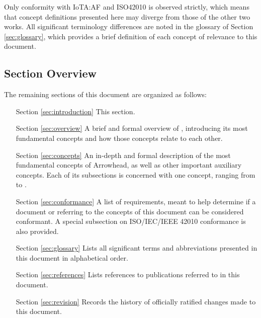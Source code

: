\begin{enumerate}
\end{enumerate}

Only conformity with IoTA:AF and ISO42010 is observed strictly, which means that concept definitions presented here may diverge from those of the other two works.
All significant terminology differences are noted in the glossary of Section \ref{sec:glossary}, which provides a brief definition of each concept of relevance to this document.

\subsection{Section Overview}
\label{sec:introduction:sections}

The remaining sections of this document are organized as follows:
\vspace*{2mm}
\begin{itemize}[leftmargin=2cm,rightmargin=0pt,labelwidth=2cm,labelsep=0pt,itemindent=0pt,parsep=0.1cm,topsep=0.1cm,align=left]

\item[Section \ref{sec:introduction}]
This section.

\item[Section \ref{sec:overview}]
A brief and formal overview of , introducing its most fundamental concepts and how those concepts relate to each other.

\item[Section \ref{sec:concepts}]
An in-depth and formal description of the most fundamental concepts of Arrowhead, as well as other important auxiliary concepts.
Each of its subsections is concerned with one concept, ranging from  to .

\item[Section \ref{sec:conformance}]
A list of requirements, meant to help determine if a document or  referring to the concepts of this document can be considered conformant.
A special subsection on ISO/IEC/IEEE 42010 conformance is also provided.

\item[Section \ref{sec:glossary}]
Lists all significant terms and abbreviations presented in this document in alphabetical order.

\item[Section \ref{sec:references}]
Lists references to publications referred to in this document.

\item[Section \ref{sec:revision}]
Records the history of officially ratified changes made to this document.

\end{itemize}
